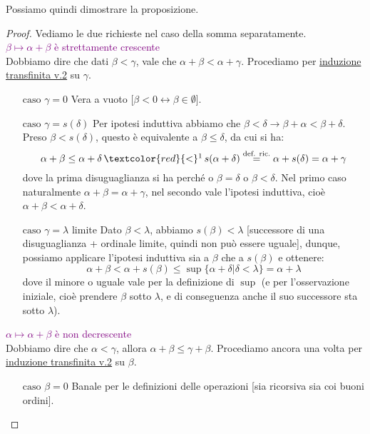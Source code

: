 \documentclass[11pt]{scrartcl}
\begin{document}
Possiamo quindi dimostrare la proposizione.

\begin{proof}
	Vediamo le due richieste nel caso della somma separatamente.\\
	\textcolor{purple}{$\beta \mapsto \alpha + \beta$ è strettamente crescente}\\
	Dobbiamo dire che dati $\beta < \gamma$, vale che $\alpha + \beta < \alpha + \gamma$. Procediamo per \hyperref[induz_transf2]{induzione transfinita v.2} su $\gamma$.
	\begin{itemize}
		\item[$\boxed{\text{caso $\gamma = 0$}}$] Vera a vuoto [$\beta < 0 \leftrightarrow \beta \in \emptyset$].
		\item[$\boxed{\text{caso $\gamma = s(\delta)$}}$] Per ipotesi induttiva abbiamo che $\beta < \delta \rightarrow \beta + \alpha < \beta + \delta$. Preso $\beta < s(\delta)$, questo è equivalente a  $\beta \leq \delta$, da cui si ha:
		\[ \alpha + \beta \leq \alpha + \delta \,\textcolor{red}{<}\footnote{Questa disuguaglianza è letteralmente la definizione di $<$ come appartenenza, che col successore è ovvia.}\, s(\alpha + \delta) \overset{\text{def. ric.}}{=} \alpha + s(\delta) = \alpha + \gamma
			\]
		dove la prima disuguaglianza si ha perché o $\beta = \delta$ o $\beta < \delta$. Nel primo caso naturalmente $\alpha + \beta = \alpha + \gamma$, nel secondo vale l'ipotesi induttiva, cioè $\alpha + \beta < \alpha + \delta$.
		\item[$\boxed{\text{caso $\gamma = \lambda$ limite}}$] Dato $\beta < \lambda$, abbiamo $s(\beta) < \lambda$ [successore di una disuguaglianza + ordinale limite, quindi non può essere uguale], dunque, possiamo applicare l'ipotesi induttiva sia a $\beta$ che a $s(\beta)$ e 
		ottenere:
		\[ \alpha + \beta < \alpha + s(\beta) \leq \sup\{\alpha + \delta | \delta < \lambda\} = \alpha + \lambda
			\]
		dove il minore o uguale vale per la definizione di $\sup$ (e per l'osservazione iniziale, cioè prendere $\beta$ sotto $\lambda$, e di conseguenza anche il suo successore sta sotto $\lambda$).
	\end{itemize}
	\textcolor{purple}{$\alpha \mapsto \alpha + \beta$ è non decrescente}\\
	Dobbiamo dire che $\alpha < \gamma$, allora $\alpha + \beta \leq \gamma + \beta$. Procediamo ancora una volta per \hyperref[induz_transf2]{induzione transfinita v.2} su $\beta$.
	\begin{itemize}
		\item[$\boxed{\text{caso $\beta = 0$}}$] Banale per le definizioni delle operazioni [sia ricorsiva sia coi buoni ordini].

\end{itemize}
\end{proof}
\end{document}
